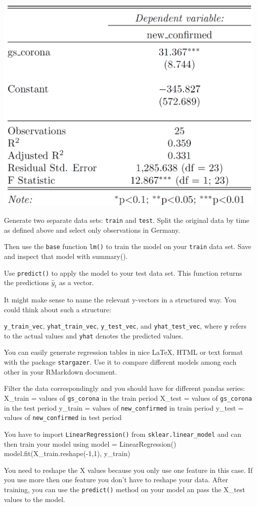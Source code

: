 \documentclass[
  11pt,
]{article}
\newenvironment{tips}[1]
  {
  \begin{itemize}
  \footnotesize
  \renewcommand{\labelitemi}{
    \raisebox{-.7\height}[0pt][0pt]{
      {\setkeys{Gin}{width=3em,keepaspectratio}
        \texttt{[image: images/\#1.png]}}
    }
  }
  \setlength{\fboxsep}{1em}
  \begin{rbox}
  \item
  }
  {
  \end{rbox}
  \end{itemize}
  }
\newenvironment{tipsp}[1]
  {
  \begin{itemize}
  \footnotesize
  \renewcommand{\labelitemi}{
    \raisebox{-.7\height}[0pt][0pt]{
      {\setkeys{Gin}{width=3em,keepaspectratio}
        \texttt{[image: images/\#1.png]}}
    }
  }
  \setlength{\fboxsep}{1em}
  \begin{pbox}
  \item
  }
  {
  \end{pbox}
  \end{itemize}
  }
\begin{document}
\begin{center}\includegraphics[width=0.5\linewidth]{plots/reg_table} \end{center}

\begin{tips}r

Generate two separate data sets: \texttt{train} and \texttt{test}. Split the original data by time as defined above and select only observations in Germany.

Then use the \texttt{base} function \texttt{lm()} to train the model on your \texttt{train} data set. Save and inspect that model with summary().

Use \texttt{predict()} to apply the model to your test data set. This function returns the predictions \(\hat{y}_t\) as a vector.

It might make sense to name the relevant y-vectors in a structured way. You could think about such a structure:

\texttt{y\_train\_vec}, \texttt{yhat\_train\_vec}, \texttt{y\_test\_vec}, and \texttt{yhat\_test\_vec}, where \texttt{y} refers to the actual values and \texttt{yhat} denotes the predicted values.

You can easily generate regression tables in nice LaTeX, HTML or text format with the package \texttt{stargazer}. Use it to compare different models among each other in your RMarkdown document.

\end{tips}

\begin{tipsp}p

Filter the data correspondingly and you should have for different pandas series:
X\_train = values of \texttt{gs\_corona} in the train period
X\_test = values of \texttt{gs\_corona} in the test period
y\_train = values of \texttt{new\_confirmed} in train period
y\_test = values of \texttt{new\_confirmed} in test period

You have to import \texttt{LinearRegression()} from \texttt{sklear.linear\_model} and can then train your model using
model = LinearRegression()
model.fit(X\_train.reshape(-1,1), y\_train)

You need to reshape the X values because you only use one feature in this case. If you use more then one feature you don't have to reshape your data.
After training, you can use the \texttt{predict()} method on your model an pass the X\_test values to the model.

\end{tipsp}
\end{document}
